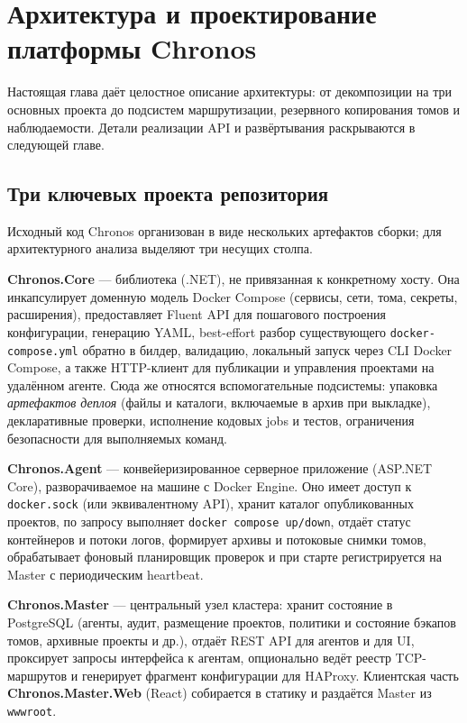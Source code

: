 \section{Архитектура и проектирование платформы Chronos}

Настоящая глава даёт целостное описание архитектуры: от декомпозиции на три основных проекта до подсистем маршрутизации, резервного копирования томов и наблюдаемости. Детали реализации API и развёртывания раскрываются в следующей главе.

\subsection{Три ключевых проекта репозитория}

Исходный код Chronos организован в виде нескольких артефактов сборки; для архитектурного анализа выделяют три несущих столпа.

\textbf{Chronos.Core} --- библиотека (.NET), не привязанная к конкретному хосту. Она инкапсулирует доменную модель Docker Compose (сервисы, сети, тома, секреты, расширения), предоставляет Fluent API для пошагового построения конфигурации, генерацию YAML, best-effort разбор существующего \texttt{docker-compose.yml} обратно в билдер, валидацию, локальный запуск через CLI Docker Compose, а также HTTP-клиент для публикации и управления проектами на удалённом агенте. Сюда же относятся вспомогательные подсистемы: упаковка \emph{артефактов деплоя} (файлы и каталоги, включаемые в архив при выкладке), декларативные проверки, исполнение кодовых jobs и тестов, ограничения безопасности для выполняемых команд.

\textbf{Chronos.Agent} --- конвейеризированное серверное приложение (ASP.NET Core), разворачиваемое на машине с Docker Engine. Оно имеет доступ к \texttt{docker.sock} (или эквивалентному API), хранит каталог опубликованных проектов, по запросу выполняет \texttt{docker compose up/down}, отдаёт статус контейнеров и потоки логов, формирует архивы и потоковые снимки томов, обрабатывает фоновый планировщик проверок и при старте регистрируется на Master с периодическим heartbeat.

\textbf{Chronos.Master} --- центральный узел кластера: хранит состояние в PostgreSQL (агенты, аудит, размещение проектов, политики и состояние бэкапов томов, архивные проекты и др.), отдаёт REST API для агентов и для UI, проксирует запросы интерфейса к агентам, опционально ведёт реестр TCP-маршрутов и генерирует фрагмент конфигурации для HAProxy. Клиентская часть \textbf{Chronos.Master.Web} (React) собирается в статику и раздаётся Master из \texttt{wwwroot}.

